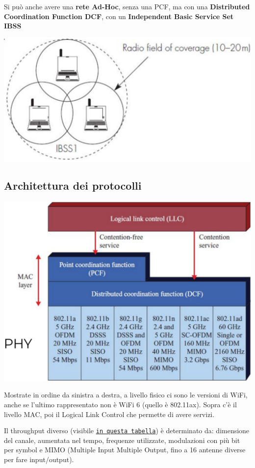 Si può anche avere una \textbf{rete Ad-Hoc}, senza una PCF, ma con una \textbf{Distributed Coordination Function DCF}, con un \textbf{Independent Basic Service Set IBSS}
\begin{center}
	\includegraphics[width=0.45\linewidth]{img/wlan/wifistruct2}
\end{center}

\subsection{Architettura dei protocolli}

\begin{center}
	\includegraphics[width=0.75\linewidth]{img/wlan/protarch1}
\end{center}

Mostrate in ordine da sinistra a destra, a livello fisico ci sono le versioni di WiFi, anche se l'ultimo rappresentato non è WiFi 6 (quello è 802.11ax). Sopra c'è il livello MAC, poi il Logical Link Control che permette di avere servizi. 

Il throughput diverso (visibile \href{https://en.wikipedia.org/wiki/IEEE_802.11#Protocol}{\texttt{in questa tabella}}) è determinato da: dimensione del canale, aumentata nel tempo, frequenze utilizzate, modulazioni con più bit per symbol e MIMO (Multiple Input Multiple Output, fino a 16 antenne diverse per fare input/output).

